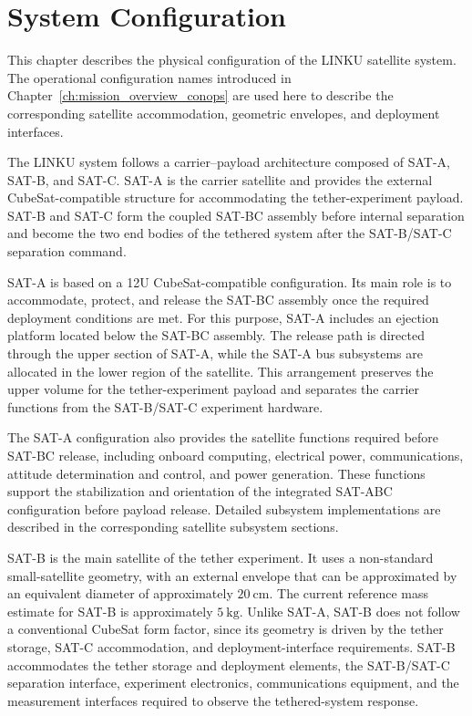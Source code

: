 \chapter{System Configuration}
\label{ch:system_configuration}

This chapter describes the physical configuration of the LINKU satellite system. The operational configuration names introduced in Chapter~\ref{ch:mission_overview_conops} are used here to describe the corresponding satellite accommodation, geometric envelopes, and deployment interfaces.

The LINKU system follows a carrier--payload architecture composed of SAT-A, SAT-B, and SAT-C. SAT-A is the carrier satellite and provides the external CubeSat-compatible structure for accommodating the tether-experiment payload. SAT-B and SAT-C form the coupled SAT-BC assembly before internal separation and become the two end bodies of the tethered system after the SAT-B/SAT-C separation command.

SAT-A is based on a 12U CubeSat-compatible configuration. Its main role is to accommodate, protect, and release the SAT-BC assembly once the required deployment conditions are met. For this purpose, SAT-A includes an ejection platform located below the SAT-BC assembly. The release path is directed through the upper section of SAT-A, while the SAT-A bus subsystems are allocated in the lower region of the satellite. This arrangement preserves the upper volume for the tether-experiment payload and separates the carrier functions from the SAT-B/SAT-C experiment hardware.

The SAT-A configuration also provides the satellite functions required before SAT-BC release, including onboard computing, electrical power, communications, attitude determination and control, and power generation. These functions support the stabilization and orientation of the integrated SAT-ABC configuration before payload release. Detailed subsystem implementations are described in the corresponding satellite subsystem sections.

SAT-B is the main satellite of the tether experiment. It uses a non-standard small-satellite geometry, with an external envelope that can be approximated by an equivalent diameter of approximately \(20~\mathrm{cm}\). The current reference mass estimate for SAT-B is approximately \(5~\mathrm{kg}\). Unlike SAT-A, SAT-B does not follow a conventional CubeSat form factor, since its geometry is driven by the tether storage, SAT-C accommodation, and deployment-interface requirements. SAT-B accommodates the tether storage and deployment elements, the SAT-B/SAT-C separation interface, experiment electronics, communications equipment, and the measurement interfaces required to observe the tethered-system response.

